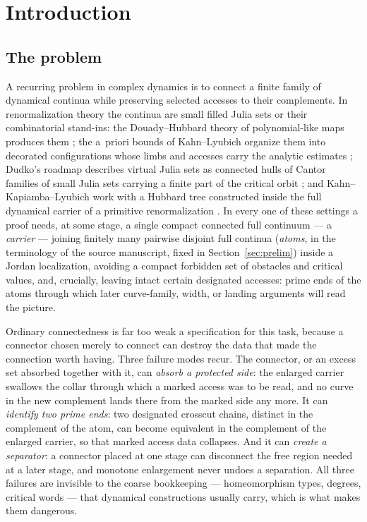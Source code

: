 
\section{Introduction}\label{sec:intro}

\subsection{The problem}\label{subsec:A-problem}

A recurring problem in complex dynamics is to connect a finite family of
dynamical continua while preserving selected accesses to their complements.
In renormalization theory the continua are small filled Julia sets or their
combinatorial stand-ins: the Douady--Hubbard theory of polynomial-like maps
produces them \cite{DH85}; the a~priori bounds of Kahn--Lyubich organize them
into decorated configurations whose limbs and accesses carry the analytic
estimates \cite{KL08}; Dudko's roadmap describes virtual Julia sets as
connected hulls of Cantor families of small Julia sets carrying a finite part
of the critical orbit \cite{Dud25}; and Kahn--Kapiamba--Lyubich work with a
Hubbard tree constructed inside the full dynamical carrier of a primitive
renormalization \cite{KKL26}.  In every one of these settings a proof needs,
at some stage, a single compact connected full continuum --- a
\emph{carrier} --- joining finitely many pairwise disjoint full continua
(\emph{atoms}, in the terminology of the source manuscript, fixed in
Section~\ref{sec:prelim}) inside a Jordan localization, avoiding a compact
forbidden set of obstacles and critical values, and, crucially, leaving
intact certain designated accesses: prime ends of the atoms through which
later curve-family, width, or landing arguments will read the picture.

Ordinary connectedness is far too weak a specification for this task,
because a connector chosen merely to connect can destroy the data that made
the connection worth having.  Three failure modes recur.  The connector, or
an excess set absorbed together with it, can \emph{absorb a protected side}:
the enlarged carrier swallows the collar through which a marked access was
to be read, and no curve in the new complement lands there from the marked
side any more.  It can \emph{identify two prime ends}: two designated
crosscut chains, distinct in the complement of the atom, can become
equivalent in the complement of the enlarged carrier, so that marked access
data collapses.  And it can \emph{create a separator}: a connector placed at
one stage can disconnect the free region needed at a later stage, and
monotone enlargement never undoes a separation.  All three failures are
invisible to the coarse bookkeeping --- homeomorphism types, degrees,
critical words --- that dynamical constructions usually carry, which is what
makes them dangerous.

